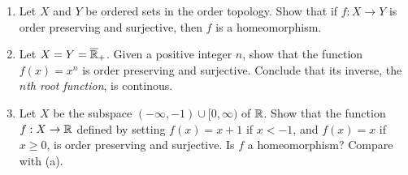 \begin{exercise}[ID=3.24.7]
  \begin{enumerate}[label={(\alph*)}, align=left, leftmargin=\parindent, listparindent=\parindent, labelwidth=0pt, itemindent=!]
    \item
      Let $X$ and $Y$ be ordered sets in the order topology.
      Show that if $f: X \rightarrow Y$ is order preserving and surjective, then $f$ is a homeomorphism.
    \item
      Let $X = Y = \overline{\mathbb{R}}_+$.
      Given a positive integer $n$, show that the function $f(x) = x^n$ is order preserving and surjective.
      Conclude that its inverse, the $n$\textit{th root function}, is continous.
    \item 
      Let $X$ be the subspace $(-\infty, -1) \cup [0, \infty)$ of $\mathbb{R}$.
      Show that the function $f: X \rightarrow \mathbb{R}$ defined by setting $f(x) = x + 1$ if $x < -1$, and $f(x) = x$ if $x \geq 0$, is order preserving and surjective.
      Is $f$ a homeomorphism?
      Compare with (a).
    \end{enumerate}
\end{exercise}
%
